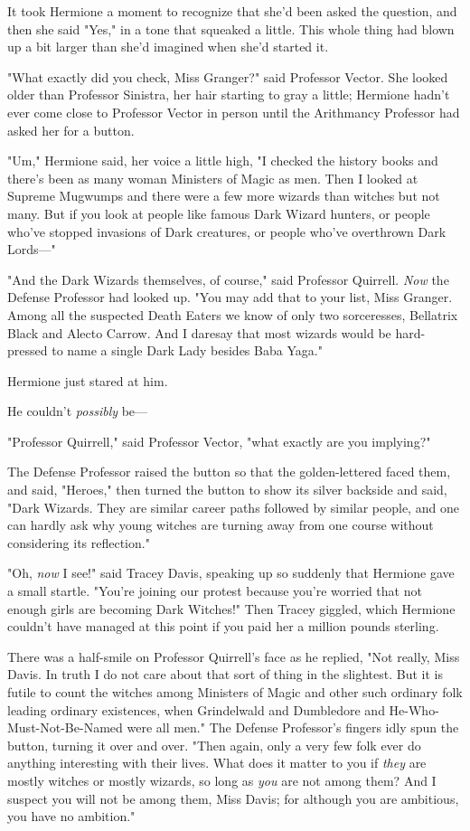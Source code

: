It took Hermione a moment to recognize that she'd been asked the question, and
then she said "Yes," in a tone that squeaked a little. This whole thing had
blown up a bit larger than she'd imagined when she'd started it.

"What exactly did you check, Miss Granger?" said Professor Vector. She looked
older than Professor Sinistra, her hair starting to gray a little; Hermione
hadn't ever come close to Professor Vector in person until the Arithmancy
Professor had asked her for a button.

"Um," Hermione said, her voice a little high, "I checked the history books and
there's been as many woman Ministers of Magic as men. Then I looked at Supreme
Mugwumps and there were a few more wizards than witches but not many. But if
you look at people like famous Dark Wizard hunters, or people who've stopped
invasions of Dark creatures, or people who've overthrown Dark Lords---"

"And the Dark Wizards themselves, of course," said Professor Quirrell.
\emph{Now} the Defense Professor had looked up. "You may add that to your list,
Miss Granger. Among all the suspected Death Eaters we know of only two
sorceresses, Bellatrix Black and Alecto Carrow. And I daresay that most wizards
would be hard-pressed to name a single Dark Lady besides Baba Yaga."

Hermione just stared at him.

He couldn't \emph{possibly} be---

"Professor Quirrell," said Professor Vector, "what exactly are you implying?"

The Defense Professor raised the button so that the golden-lettered \SPHEW
faced them, and said, "Heroes," then turned the button to show its silver
backside and said, "Dark Wizards. They are similar career paths followed by
similar people, and one can hardly ask why young witches are turning away from
one course without considering its reflection."

"Oh, \emph{now} I see!" said Tracey Davis, speaking up so suddenly that
Hermione gave a small startle. "You're joining our protest because you're
worried that not enough girls are becoming Dark Witches!" Then Tracey giggled,
which Hermione couldn't have managed at this point if you paid her a million
pounds sterling.

There was a half-smile on Professor Quirrell's face as he replied, "Not really,
Miss Davis. In truth I do not care about that sort of thing in the slightest.
But it is futile to count the witches among Ministers of Magic and other such
ordinary folk leading ordinary existences, when Grindelwald and Dumbledore and
He-Who-Must-Not-Be-Named were all men." The Defense Professor's fingers idly
spun the button, turning it over and over. "Then again, only a very few folk
ever do anything interesting with their lives. What does it matter to you if
\emph{they} are mostly witches or mostly wizards, so long as \emph{you} are not
among them? And I suspect you will not be among them, Miss Davis; for although
you are ambitious, you have no ambition."

